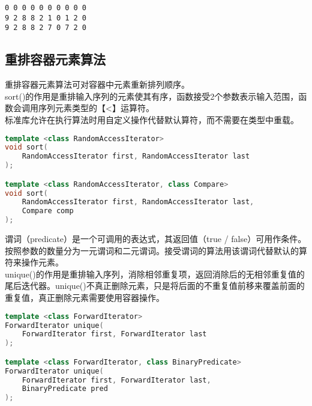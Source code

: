 \begin{tcolorbox}
	\begin{verbatim}
0 0 0 0 0 0 0 0 0 0 
9 2 8 8 2 1 0 1 2 0
9 2 8 8 2 7 0 7 2 0
	\end{verbatim}
\end{tcolorbox}

\subsection{重排容器元素算法}

重排容器元素算法可对容器中元素重新排列顺序。 \\

sort()的作用是重排输入序列的元素使其有序，函数接受2个参数表示输入范围，函数会调用序列元素类型的【<】运算符。 \\

标准库允许在执行算法时用自定义操作代替默认算符，而不需要在类型中重载。

\vspace{-0.5cm}

\begin{lstlisting}[language=C++]
template <class RandomAccessIterator>
void sort(
	RandomAccessIterator first, RandomAccessIterator last
);

template <class RandomAccessIterator, class Compare>
void sort(
	RandomAccessIterator first, RandomAccessIterator last, 
	Compare comp
);
\end{lstlisting}

谓词（predicate）是一个可调用的表达式，其返回值（true / false）可用作条件。按照参数的数量分为一元谓词和二元谓词。接受谓词的算法用该谓词代替默认的算符来操作元素。 \\

unique()的作用是重排输入序列，消除相邻重复项，返回消除后的无相邻重复值的尾后迭代器。unique()不真正删除元素，只是将后面的不重复值前移来覆盖前面的重复值，真正删除元素需要使用容器操作。

\vspace{-0.5cm}

\begin{lstlisting}[language=C++]
template <class ForwardIterator>
ForwardIterator unique(
	ForwardIterator first, ForwardIterator last
);

template <class ForwardIterator, class BinaryPredicate>
ForwardIterator unique(
	ForwardIterator first, ForwardIterator last,
	BinaryPredicate pred
);
\end{lstlisting}

